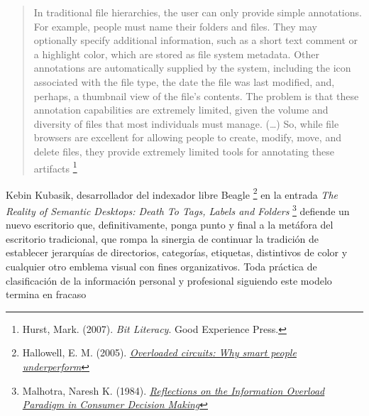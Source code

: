 \documentclass[12pt, a4paper,twoside]{book}
\begin{document}
\begin{quote}
In traditional file hierarchies, the user can only provide simple
annotations. For example, people must name their folders and files.
They may optionally specify additional information, such as a short
text comment or a highlight color, which are stored as file system
metadata. Other annotations are automatically supplied by the
system, including the icon associated with the file type, the date
the file was last modified, and, perhaps, a thumbnail view of the
file's contents. The problem is that these annotation capabilities
are extremely limited, given the volume and diversity of files that
most individuals must manage. (\ldots{}) So, while file browsers
are excellent for allowing people to create, modify, move, and
delete files, they provide extremely limited tools for annotating
these artifacts%
\footnote{Hurst, Mark. (2007). \emph{Bit Literacy}. Good Experience Press.}

\end{quote}
Kebin Kubasik, desarrollador del indexador libre Beagle%
\footnote{Hallowell, E. M. (2005).
\emph{\href{http://tr.im/wSsS}{Overloaded circuits: Why smart people underperform}}}
en la entrada
\emph{The Reality of Semantic Desktops: Death To Tags, Labels and Folders}%
\footnote{Malhotra, Naresh K. (1984).
\emph{\href{http://www.jstor.org/pss/2488913}{Reflections on the Information Overload Paradigm in Consumer Decision Making}}}
defiende un nuevo escritorio que, definitivamente, ponga punto y
final a la metáfora del escritorio tradicional, que rompa la
sinergia de continuar la tradición de establecer jerarquías de
directorios, categorías, etiquetas, distintivos de color y
cualquier otro emblema visual con fines organizativos. Toda
práctica de clasificación de la información personal y profesional
siguiendo este modelo termina en fracaso
\end{document}
